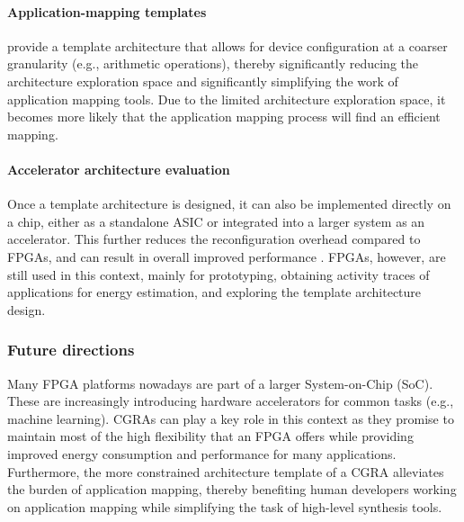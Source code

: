 \paragraph{Application-mapping templates}\citet{Charitopoulos2021MC-DeF:Applications}
provide a template architecture that allows for device configuration at a coarser granularity (e.g., arithmetic operations), thereby  significantly reducing the architecture exploration space and significantly simplifying the work of %
application mapping tools. Due to the limited architecture exploration space, it becomes more likely that the application mapping process will find an efficient mapping. %

\paragraph{Accelerator architecture evaluation} Once a template architecture is designed, %
it can also be implemented directly on a chip, either as a standalone ASIC or integrated into a larger system as an accelerator.  This further reduces the reconfiguration overhead compared to %
FPGAs, and can result in overall improved performance \cite{Wijerathne2022HiMap:Abstraction,Wijtvliet2019Blocks:Efficiency,debruin2024rblocks}.  FPGAs, however, are still used in this context, mainly for prototyping, obtaining activity traces of applications for energy estimation, and exploring the template architecture design.

\subsubsection*{\bf{Future directions}}
Many FPGA platforms nowadays are part of a larger System-on-Chip (SoC).  These are increasingly introducing hardware accelerators for common tasks (e.g., machine learning).  CGRAs can play a key role in this context as they promise to maintain most of the high flexibility that an FPGA offers while providing  improved energy consumption and performance for many applications.
Furthermore, the more constrained architecture template of a CGRA alleviates %
the burden of application mapping, thereby benefiting %
human developers working on application mapping while %
simplifying the task of high-level synthesis tools. 



